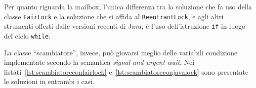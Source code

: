 \documentclass[a4paper,twoside]{article}
\newcommand\code{\lstinline[basicstyle=\normalsize\ttfamily]}
\begin{document}
Per quanto riguarda la mailbox, l'unica differenza tra la soluzione che fa uso della classe \code|FairLock| e la soluzione che si affida al \code|ReentrantLock|, e agli altri strumenti offerti dalle versioni recenti di Java, è l'uso dell'istruzione \code|if| in luogo del ciclo \code|while|.

La classe “scambiatore”, invece, può giovarsi meglio delle variabili condizione implementate secondo la semantica \emph{signal-and-urgent-wait}. Nei listati~\ref{lst:scambiatoreconfairlock} e~\ref{lst:scambiatoreconjavalock} sono presentate le soluzioni in entrambi i casi.




\renewcommand{\topfraction}{0.9}
\end{document}
